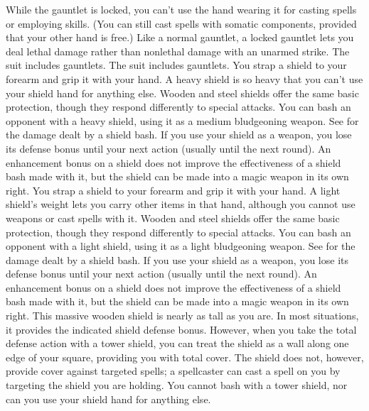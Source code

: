 \par While the gauntlet is locked, you can't use the hand wearing it for casting spells or employing skills. (You can still cast spells with somatic components, provided that your other hand is free.)
Like a normal gauntlet, a locked gauntlet lets you deal lethal damage rather than nonlethal damage with an unarmed strike.
 The suit includes gauntlets.
 The suit includes gauntlets.
 You strap a shield to your forearm and grip it with your hand. A heavy shield is so heavy that you can't use your shield hand for anything else.
 Wooden and steel shields offer the same basic protection, though they respond differently to special attacks.
 You can bash an opponent with a heavy shield, using it as a medium bludgeoning weapon. See  for the damage dealt by a shield bash.  If you use your shield as a weapon, you lose its defense bonus until your next action (usually until the next round). An enhancement bonus on a shield does not improve the effectiveness of a shield bash made with it, but the shield can be made into a magic weapon in its own right.
 You strap a shield to your forearm and grip it with your hand. A light shield's weight lets you carry other items in that hand, although you cannot use weapons or cast spells with it.
 Wooden and steel shields offer the same basic protection, though they respond differently to special attacks.
 You can bash an opponent with a light shield, using it as a light bludgeoning weapon. See  for the damage dealt by a shield bash. If you use your shield as a weapon, you lose its defense bonus until your next action (usually until the next round). An enhancement bonus on a shield does not improve the effectiveness of a shield bash made with it, but the shield can be made into a magic weapon in its own right.
 This massive wooden shield is nearly as tall as you are. In most situations, it provides the indicated shield defense bonus. However, when you take the total defense action with a tower shield, you can treat the shield as a wall along one edge of your square, providing you with total cover. The shield does not, however, provide cover against targeted spells; a spellcaster can cast a spell on you by targeting the shield you are holding. You cannot bash with a tower shield, nor can you use your shield hand for anything else.

